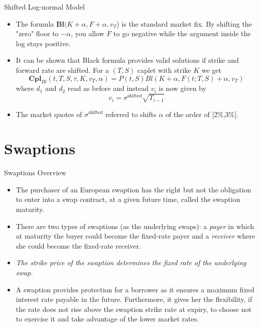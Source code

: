 \documentclass{beamer}
\begin{document}
\begin{frame}{Shifted Log-normal Model }
\begin{itemize}
\item The formula $\textbf{Bl}(K+\alpha,F+\alpha,v_T$) is the standard market fix. By shifting the "zero" floor to $-\alpha$, you allow $F$ to go negative while the argument inside the log stays positive.
\item It can be shown that Black formula provides valid solutions if strike and forward rate are \textcolor{maincolor}{shifted}. For a $(T,S)$ caplet with strike $K$ we get
\begin{equation}
	\textbf{Cpl}_{Bl}(t,T,S,\tau,K,v_T,\alpha) = P(t,S) Bl(K+\alpha,F(t;T,S)+\alpha,v_T)
\end{equation}
where $d_1$ and $d_2$ read as before and instead $v_i$ is now given by
\begin{equation*}
	v_i = \sigma^{\text{shifted}}\sqrt{T_{i-1}}
\end{equation*}
\item The market quotes of $\sigma^{\text{shifted}}$ referred to shifts $\alpha$ of the order of [2\%,3\%].
\end{itemize}
\end{frame}


\section{Swaptions}
\begin{frame}{Swaptions Overview}
\begin{itemize}
\item<1-> The purchaser of an \textcolor{maincolor}{European swaption} has the right but not the obligation to enter into a swap contract, at a given future time, called the \textcolor{maincolor}{swaption maturity}.
\item<2-> There are two types of \textcolor{maincolor}{swaptions} (as the underlying swaps): a \emph{payer} in which at maturity the buyer could become the fixed-rate payer and a \emph{receiver} where she could become the fixed-rate receiver.
\item <3-> \emph{The strike price of the swaption determines the fixed rate of the underlying swap.}
\item<4-> A swaption provides protection for a borrower as it ensures a maximum fixed interest rate payable in the future. Furthermore, it gives her the flexibility, if the rate does not rise above the swaption strike rate at expiry, to choose not to exercise it and take advantage of the lower market rates.
\end{itemize}
\end{frame}
\end{document}

